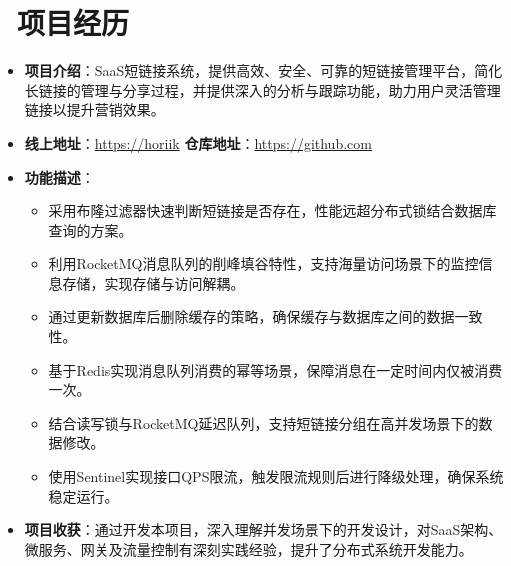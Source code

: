 \documentclass{../../styles/resume}
\begin{document}
\section{\faProjectDiagram\ 项目经历}

\begin{itemize}[leftmargin=*, labelsep=0.5em]
  \item \textbf{项目介绍}：SaaS短链接系统，提供高效、安全、可靠的短链接管理平台，简化长链接的管理与分享过程，并提供深入的分析与跟踪功能，助力用户灵活管理链接以提升营销效果。
  \item \textbf{线上地址}：\url{https://horiik} \quad \textbf{仓库地址}：\url{https://github.com}
  \item \textbf{功能描述}：
    \begin{itemize}
      \item 采用布隆过滤器快速判断短链接是否存在，性能远超分布式锁结合数据库查询的方案。
      \item 利用RocketMQ消息队列的削峰填谷特性，支持海量访问场景下的监控信息存储，实现存储与访问解耦。
      \item 通过更新数据库后删除缓存的策略，确保缓存与数据库之间的数据一致性。
      \item 基于Redis实现消息队列消费的幂等场景，保障消息在一定时间内仅被消费一次。
      \item 结合读写锁与RocketMQ延迟队列，支持短链接分组在高并发场景下的数据修改。
      \item 使用Sentinel实现接口QPS限流，触发限流规则后进行降级处理，确保系统稳定运行。
    \end{itemize}
  \item \textbf{项目收获}：通过开发本项目，深入理解并发场景下的开发设计，对SaaS架构、微服务、网关及流量控制有深刻实践经验，提升了分布式系统开发能力。
\end{itemize}
\end{document}
